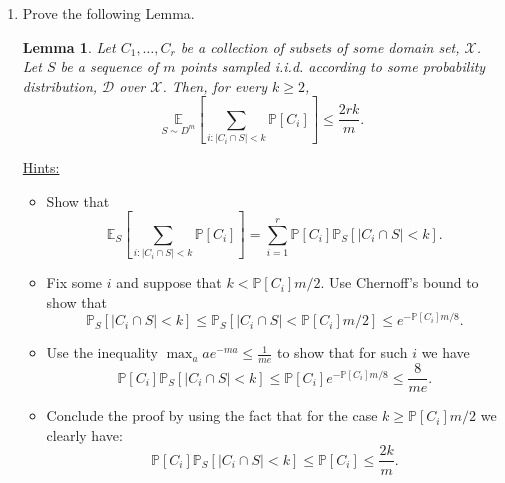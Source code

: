 \documentclass[12pt,letterpaper]{article}
\newtheorem{lemma}{Lemma}
\theoremstyle{definition}
\begin{document}
\begin{enumerate}[label=(\alph*)]
    \item  Prove the following Lemma.
    \begin{lemma}\label{lem1}
    Let $C_{1}, \ldots, C_{r}$ be a collection of subsets of some domain set, $\mathcal{X}$. Let $S$ be a sequence of $m$ points sampled i.i.d. according to some probability distribution, $\mathcal{D}$ over $\mathcal{X}$. Then, for every $k \geq 2$,
$$
\underset{S \sim D^{m}}{\mathbb{E}}\left[\sum_{i:\left|C_{i} \cap S\right|<k} \mathbb{P}\left[C_{i}\right]\right] \leq \frac{2 r k}{m} .
$$
    \end{lemma}
    \underline{Hints:}
    \begin{itemize}
        \item Show that
$$
\mathbb{E}_{S}\left[\sum_{i:\left|C_{i} \cap S\right|<k} \mathbb{P}\left[C_{i}\right]\right]=\sum_{i=1}^{r} \mathbb{P}\left[C_{i}\right] \mathbb{P}_{S}\left[\left|C_{i} \cap S\right|<k\right] .
$$
        \item Fix some $i$ and suppose that $k<\mathbb{P}\left[C_{i}\right] m / 2$. Use Chernoff's bound to show that
$$
\mathbb{P}_{S}\left[\left|C_{i} \cap S\right|<k\right] \leq \mathbb{P}_{S}\left[\left|C_{i} \cap S\right|<\mathbb{P}\left[C_{i}\right] m / 2\right] \leq e^{-\mathbb{P}\left[C_{i}\right] m / 8} .
$$
        \item Use the inequality $\max _{a} a e^{-m a} \leq \frac{1}{m e}$ to show that for such $i$ we have
$$
\mathbb{P}\left[C_{i}\right] \mathbb{P}_{S}\left[\left|C_{i} \cap S\right|<k\right] \leq \mathbb{P}\left[C_{i}\right] e^{-\mathbb{P}\left[C_{i}\right] m / 8} \leq \frac{8}{m e} .
$$
\item  Conclude the proof by using the fact that for the case $k \geq \mathbb{P}\left[C_{i}\right] m / 2$ we clearly have:
$$
\mathbb{P}\left[C_{i}\right] \mathbb{P}_{S}\left[\left|C_{i} \cap S\right|<k\right] \leq \mathbb{P}\left[C_{i}\right] \leq \frac{2 k}{m} .
$$
    \end{itemize}


\end{enumerate}
\end{document}
